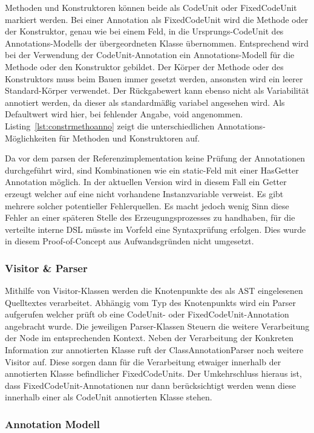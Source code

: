 \documentclass[12pt,oneside,a4paper,parskip]{scrbook}
\begin{document}
Methoden und Konstruktoren können beide als CodeUnit oder FixedCodeUnit markiert werden. Bei einer Annotation als FixedCodeUnit wird die Methode oder der Konstruktor, genau wie bei einem Feld, in die Ursprungs-CodeUnit des Annotations-Modells der übergeordneten Klasse übernommen. Entsprechend wird bei der Verwendung der CodeUnit-Annotation ein Annotations-Modell für die Methode oder den Konstruktor gebildet. Der Körper der Methode oder des Konstruktors muss beim Bauen immer gesetzt werden, ansonsten wird ein leerer Standard-Körper verwendet. Der Rückgabewert kann ebenso nicht als Variabilität annotiert werden, da dieser als standardmäßig variabel angesehen wird. Als Defaultwert wird hier, bei fehlender Angabe, void angenommen. Listing~\ref{lst:constrmethoanno} zeigt die unterschiedlichen Annotations-Möglichkeiten für Methoden und Konstruktoren auf.

Da vor dem parsen der Referenzimplementation keine Prüfung der Annotationen durchgeführt wird, sind Kombinationen wie ein static-Feld mit einer HasGetter Annotation möglich. In der aktuellen Version wird in diesem Fall ein Getter erzeugt welcher auf eine nicht vorhandene Instanzvariable verweist. Es gibt mehrere solcher potentieller Fehlerquellen. Es macht jedoch wenig Sinn diese Fehler an einer späteren Stelle des Erzeugungsprozesses zu handhaben, für die verteilte interne DSL müsste im Vorfeld eine Syntaxprüfung erfolgen. Dies wurde in diesem Proof-of-Concept aus Aufwandsgründen nicht umgesetzt.

\subsubsection{Visitor \& Parser}

Mithilfe von Visitor-Klassen werden die Knotenpunkte des als AST eingelesenen Quelltextes verarbeitet. Abhängig vom Typ des Knotenpunkts wird ein Parser aufgerufen welcher prüft ob eine CodeUnit- oder FixedCodeUnit-Annotation angebracht wurde. Die jeweiligen Parser-Klassen Steuern die weitere Verarbeitung der Node im entsprechenden Kontext. Neben der Verarbeitung der Konkreten Information zur annotierten Klasse ruft der ClassAnnotationParser noch weitere Visitor auf. Diese sorgen dann für die Verarbeitung etwaiger innerhalb der annotierten Klasse befindlicher FixedCodeUnits. Der Umkehrschluss hieraus ist, dass FixedCodeUnit-Annotationen nur dann berücksichtigt werden wenn diese innerhalb einer als CodeUnit annotierten Klasse stehen.

\subsubsection{Annotation Modell}
\end{document}

